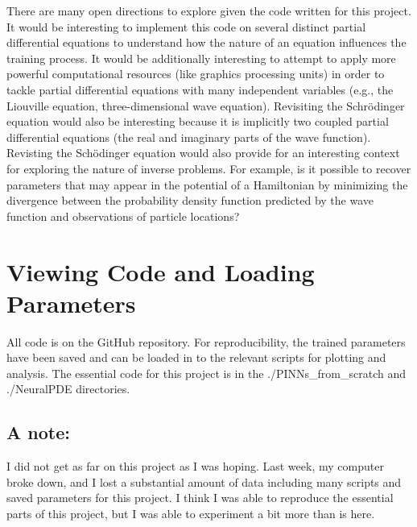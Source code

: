 \documentclass[11pt]{article}
\newcommand{\1}{\mathbf 1}
\begin{document}
There are many open directions to explore given the code written for this project.
It would be interesting to implement this code on several distinct partial differential equations to understand how the nature of an equation influences the training process.
It would be additionally interesting to attempt to apply more powerful computational resources (like graphics processing units) in order to tackle partial differential equations with many independent variables (e.g., the Liouville equation, three-dimensional wave equation).
Revisiting the Schr\"odinger equation would also be interesting because it is implicitly two coupled partial differential equations (the real and imaginary parts of the wave function).
Revisting the Sch\"odinger equation would also provide for an interesting context for exploring the nature of inverse problems.
For example, is it possible to recover parameters that may appear in the potential of a Hamiltonian by minimizing the divergence between the probability density function predicted by the wave function and observations of particle locations?

\section{Viewing Code and Loading Parameters}

All code is on the GitHub repository.
For reproducibility, the trained parameters have been saved and can be loaded in to the relevant scripts for plotting and analysis.
The essential code for this project is in the ./PINNs\_from\_scratch and ./NeuralPDE directories.


\subsection*{A note:}

I did not get as far on this project as I was hoping.
Last week, my computer broke down, and I lost a substantial amount of data including many scripts and saved parameters for this project.
I think I was able to reproduce the essential parts of this project, but I was able to experiment a bit more than is here.
\end{document}
